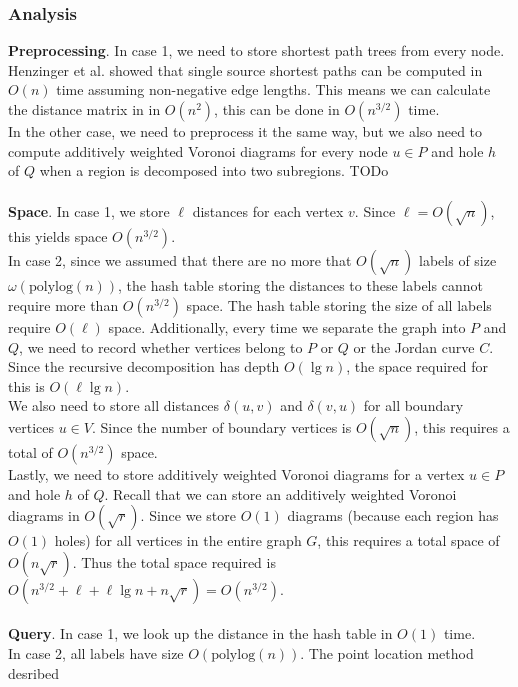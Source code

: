 \subsubsection{Analysis}
\textbf{Preprocessing}.
In case 1, we need to store shortest path
trees from every node. Henzinger et al. showed that single source shortest paths can be
computed in $O(n)$ time \cite{henzinger1997faster} assuming non-negative edge lengths.
This means we can calculate the distance matrix in in $O(n^2)$, this
can be done in $O(n^{3/2})$ time. \\
In the other case, we need to preprocess it the same way, but we also need to compute
additively weighted Voronoi diagrams for every node $u\in P$ and hole $h$ of $Q$ when a
region is decomposed into two subregions. TODo \\
\\
\textbf{Space}.
In case 1, we store $\ell$ distances for each vertex $v$. Since $\ell=O(\sqrt{n})$, this
yields space $O(n^{3/2})$. \\
In case 2, since we assumed that there are no more that
$O(\sqrt{n})$ labels of size $\omega(\text{polylog}(n))$, the hash table storing the
distances to these labels cannot require more than $O(n^{3/2})$ space. The hash table
storing the size of all labels require $O(\ell)$ space. Additionally, every time we
separate the graph into $P$ and $Q$, we need to record whether vertices belong to $P$ or
$Q$ or the Jordan curve $C$. Since the recursive decomposition has depth $O(\lg n)$, the
space required for this is $O(\ell\lg n)$. \\
We also need to store all distances $\delta(u,v)$ and $\delta(v,u)$ for all
boundary vertices $u\in V$. Since the number of boundary vertices is $O(\sqrt{n})$, this
requires a total of $O(n^{3/2})$ space. \\
Lastly, we need to store additively weighted Voronoi diagrams for a vertex $u\in P$ and
hole $h$ of $Q$. Recall that we can store an additively weighted Voronoi diagrams in
$O(\sqrt{r})$. Since we store $O(1)$ diagrams (because each region has $O(1)$ holes) for
all vertices in the entire graph $G$, this requires a total space of $O(n\sqrt{r})$.
Thus the total space required is $O(n^{3/2}+\ell+\ell\lg n+n\sqrt{r})=O(n^{3/2})$. \\
\\
\textbf{Query}.
In case 1, we look up the distance in the hash table in $O(1)$ time.\\
In case 2, all labels have size $O(\text{polylog}(n))$. The point location method desribed

